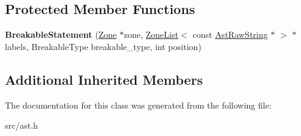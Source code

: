 \subsection*{Protected Member Functions}
\begin{DoxyCompactItemize}
\item 
\hypertarget{classv8_1_1internal_1_1_breakable_statement_a36d138d79514db4e82326cf7db7612b2}{}{\bfseries Breakable\+Statement} (\hyperlink{classv8_1_1internal_1_1_zone}{Zone} $\ast$zone, \hyperlink{classv8_1_1internal_1_1_zone_list}{Zone\+List}$<$ const \hyperlink{classv8_1_1internal_1_1_ast_raw_string}{Ast\+Raw\+String} $\ast$ $>$ $\ast$labels, Breakable\+Type breakable\+\_\+type, int position)\label{classv8_1_1internal_1_1_breakable_statement_a36d138d79514db4e82326cf7db7612b2}

\end{DoxyCompactItemize}
\subsection*{Additional Inherited Members}


The documentation for this class was generated from the following file\+:\begin{DoxyCompactItemize}
\item 
src/ast.\+h\end{DoxyCompactItemize}

